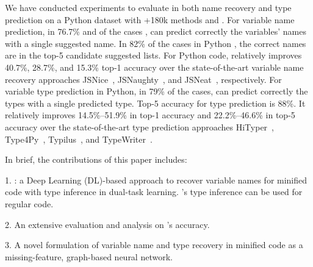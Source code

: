 We have conducted experiments to evaluate {\tool} in both name
recovery and type prediction on a Python dataset with +180k methods
and {\color{blue}{and a JavaScript (JS) dataset with XXXk
    methods}}. For variable name prediction, in 76.7\% and
{\color{blue}{XX.X\%}} of the cases {\color{blue}{in Python and JS
    code respectively}}, {\tool} can predict correctly the variables'
names with a single suggested name. In 82\% {\color{blue}{and XX\%}}
of the cases in Python {\color{blue}{and JS code}}, the correct names
are in the top-5 candidate suggested lists. For Python code, {\tool}
relatively improves 40.7\%, 28.7\%, and 15.3\% top-1 accuracy over the
state-of-the-art variable name recovery approaches
JSNice~\cite{JSNice2015}, JSNaughty~\cite{JSNaughty2017}, and
JSNeat~\cite{icse19}, respectively.
%
{\color{blue}{For JS code, the relative improvements are XX.X\%,
    YY.Y\%, and ZZ.Z\%, respectively.}} For variable type prediction
in Python, in 79\% of the cases, {\tool} can predict correctly the
types with a single predicted type. Top-5 accuracy for type prediction
is 88\%. It relatively improves 14.5\%--51.9\% in top-1 accuracy and
22.2\%--46.6\% in top-5 accuracy over the state-of-the-art type
prediction approaches HiTyper~\cite{HiTyper-icse22},
Type4Py~\cite{Type4Py-icse22}, Typilus~\cite{typilus-pldi20}, and
TypeWriter~\cite{typewriter-fse20}.

In brief, the contributions of this paper includes:

1. {\bf {\tool}}: a Deep Learning (DL)-based approach to recover
variable names for minified code with type inference in dual-task
learning. {\tool}'s type inference can be used for regular code.

2. An extensive evaluation and analysis on {\tool}'s
accuracy.



3. A novel formulation of variable name and type recovery in
minified code as a missing-feature, graph-based neural network.
